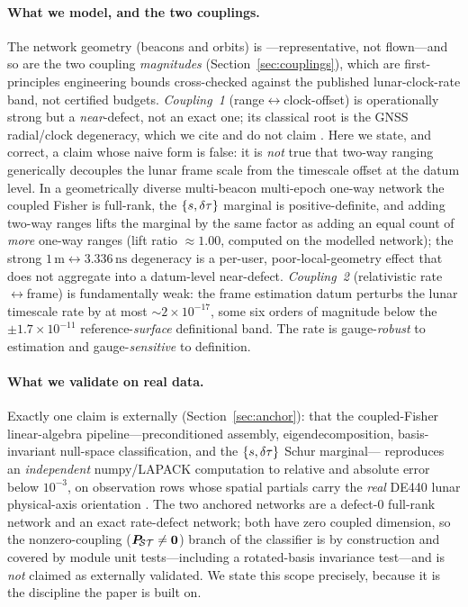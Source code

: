 \paragraph{What we model, and the two couplings.}
The network geometry (beacons and orbits) is \Modelled{}---representative, not flown---and
so are the two coupling \emph{magnitudes} (Section~\ref{sec:couplings}), which are
first-principles engineering bounds cross-checked against the published lunar-clock-rate
band, not certified budgets. \emph{Coupling~1} (range$\leftrightarrow$clock-offset) is
operationally strong but a \emph{near}-defect, not an exact one; its classical root is the
GNSS radial/clock degeneracy, which we cite and do not claim
\citep{sturza1988,brown1992,parkinson1988}. Here we state, and correct, a claim whose
naive form is false: it is \emph{not} true that two-way ranging generically decouples the
lunar frame scale from the timescale offset at the datum level. In a geometrically diverse
multi-beacon multi-epoch one-way network the coupled Fisher is full-rank, the
$\{s,\delta\tau\}$ marginal is positive-definite, and adding two-way ranges lifts the marginal
by the same factor as adding an equal count of \emph{more} one-way ranges (lift ratio
$\approx1.00$, computed on the modelled network); the strong
$1\,\mathrm{m}\leftrightarrow3.336\,\mathrm{ns}$ degeneracy is a
per-user, poor-local-geometry effect that does not aggregate into a datum-level
near-defect. \emph{Coupling~2} (relativistic rate$\leftrightarrow$frame) is fundamentally
weak: the frame estimation datum perturbs the lunar timescale rate by at most
$\sim\!2\times10^{-17}$, some six orders of magnitude below the
$\pm1.7\times10^{-11}$ reference-\emph{surface} definitional band. The rate is
gauge-\emph{robust} to estimation and gauge-\emph{sensitive} to definition.

\paragraph{What we validate on real data.}
Exactly one claim is externally \Validated{} (Section~\ref{sec:anchor}): that the
coupled-Fisher linear-algebra pipeline---preconditioned assembly, eigendecomposition,
basis-invariant null-space classification, and the $\{s,\delta\tau\}$ Schur marginal---%
reproduces an \emph{independent} numpy/LAPACK computation to relative and absolute error
below $10^{-3}$, on observation rows whose spatial partials carry the \emph{real} DE440
lunar physical-axis orientation \citep{park2021de440}. The two anchored networks are a
defect-$0$ full-rank network and an exact rate-defect network; both have zero coupled
dimension, so the nonzero-coupling ($\bm{P}_{\!\mathcal{S}\mathcal{T}}\neq\bm0$) branch of the classifier is
\Proven{} by construction and covered by module unit tests---including a rotated-basis
invariance test---and is \emph{not} claimed as externally validated. We state this scope
precisely, because it is the discipline the paper is built on.

